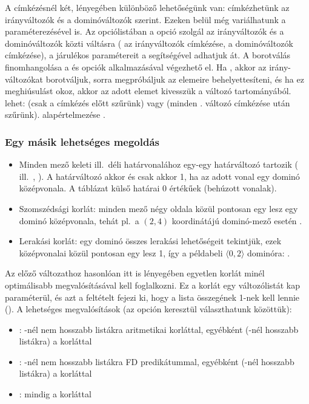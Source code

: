 A címkézésnél két, lényegében különböző lehetőségünk van: címkézhetünk az irányváltozók és
a dominóváltozók szerint. Ezeken belül még variálhatunk a  paraméterezésével
is. Az opciólistában a  opció szolgál az irányváltozók és a dominóváltozók
közti váltásra ( az irányváltozók címkézése,  a dominóváltozók
címkézése), a  járulékos paramétereit a  segítségével
adhatjuk át. A borotválás finomhangolása a  és  opciók
alkalmazásával végezhető el. Ha , akkor az irány-változókat borotváljuk,
sorra megpróbáljuk az  elemeire behelyettesíteni, és ha ez meghiúsulást okoz, akkor
az adott elemet kivesszük a változó tartományából.  lehet:  (csak a
címkézés előtt szűrünk) vagy  (minden . változó címkézése után szűrünk).
 alapértelmezése \cd{[{\em w},{\em n}]}.

\subsubsection{Egy másik lehetséges megoldás}

\begin{itemize}
\item Minden mező keleti ill.\ déli határvonalához egy-egy határváltozó
        tartozik ( ill.\ , ). A határváltozó akkor
        és csak akkor 1, ha az adott vonal egy dominó középvonala. A
        táblázat külső határai 0 értékűek (behúzott vonalak).
\item Szomszédsági korlát: minden mező négy oldala közül pontosan egy lesz
egy dominó középvonala, tehát pl.\ a $(2,4)$ koordinátájú dominó-mező esetén
.
\item Lerakási korlát: egy dominó összes lerakási lehetőségeit tekintjük,
ezek középvonalai közül pontosan egy lesz 1, így a példabeli
$\langle0,2\rangle$ dominóra: .
\end{itemize}

Az előző változathoz hasonlóan itt is lényegében egyetlen korlát minél optimálisabb
megvalósításával kell foglalkozni. Ez a korlát egy változólistát kap paraméterül,
és azt a feltételt fejezi ki, hogy a lista összegének 1-nek kell lennie
(). A lehetséges megvalósítások (az  opción
keresztül választhatunk közöttük):

\begin{itemize}
        \item {}: -nél nem hosszabb listákra aritmetikai korláttal,
	egyébként (-nél hosszabb listákra) a  korláttal
        \item {}: -nél nem hosszabb listákra FD predikátummal,
	egyébként (-nél hosszabb listákra) a  korláttal
        \item {}: mindig a  korláttal
\end{itemize}

